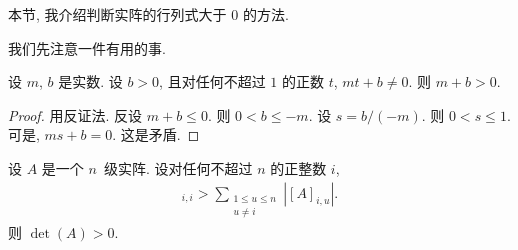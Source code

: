 \documentclass[../libro.tex]{subfiles}
\begin{document}
本节, 我介绍判断实阵的行列式大于 \(0\) 的方法.

我们先注意一件有用的事.

\begin{theorem}
    设 \(m\), \(b\) 是实数.
    设 \(b > 0\), 且对任何不超过 \(1\) 的正数 \(t\),
    \(mt + b \neq 0\).
    则 \(m + b > 0\).
\end{theorem}

\begin{proof}
    用反证法.
    反设 \(m + b \leq 0\).
    则 \(0 < b \leq -m\).
    设 \(s = b/(-m)\).
    则 \(0 < s \leq 1\).
    可是, \(ms + b = 0\).
    这是矛盾.
\end{proof}

\begin{theorem}
    设 \(A\) 是一个 \(n\)~级实阵.
    设对任何不超过 \(n\) 的正整数 \(i\),
    \begin{align*}
        [A]_{i,i} >
        \sum_{\substack{1 \leq u \leq n \\
        u \neq i}} {|[A]_{i,u}|}.
    \end{align*}
    则 \(\det {(A)} > 0\).
\end{theorem}
\end{document}
